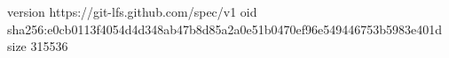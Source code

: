 version https://git-lfs.github.com/spec/v1
oid sha256:e0cb0113f4054d4d348ab47b8d85a2a0e51b0470ef96e549446753b5983e401d
size 315536
